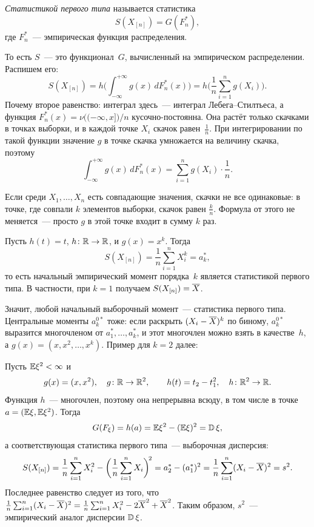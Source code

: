 \begin{definition}
  \emph{Статистикой первого типа} называется статистика
  \[
    S(X_{[n]}) = G(F_n^*),
  \]
  где $F_n^*$~--- эмпирическая функция распределения.
\end{definition}

То есть $S$~--- это функционал~$G$, вычисленный на эмпирическом распределении.
Распишем его:
\[
  S(X_{[n]})
  = h\biggl(\int_{-\infty}^{+\infty} g(x)\, dF_n^*(x)\biggr)
  = h\biggl(\frac{1}{n} \sum_{i=1}^{n} g(X_i)\biggr).
\]
Почему второе равенство: интеграл здесь~--- интеграл Лебега--Стилтьеса, а функция
$F_n^*(x) = \nu\bigl((-\infty, x]\bigr)/n$ кусочно-постоянна.
Она растёт только скачками в точках выборки, и в каждой точке $X_i$ скачок равен~$\frac1n$.
При интегрировании по такой функции значение $g$ в точке скачка умножается на величину
скачка, поэтому
\[
  \int_{-\infty}^{+\infty} g(x)\, dF_n^*(x) = \sum_{i=1}^{n} g(X_i) \cdot \frac{1}{n}.
\]

\begin{remark}
  Если среди $X_1, \ldots, X_n$ есть совпадающие значения, скачки не все одинаковые:
  в точке, где совпали $k$ элементов выборки, скачок равен $\frac{k}{n}$.
  Формула от этого не меняется~--- просто $g$ в этой точке входит в сумму $k$ раз.
\end{remark}

\begin{example}
  Пусть $h(t) = t$, $h \colon \mathbb{R} \to \mathbb{R}$, и $g(x) = x^k$. Тогда
  \[
    S(X_{[n]}) = \frac{1}{n} \sum_{i=1}^{n} X_i^k = a_k^*,
  \]
  то есть начальный эмпирический момент порядка~$k$ является статистикой первого типа.
  В частности, при $k = 1$ получаем $S(X_{[n]}) = \overline{X}$.
\end{example}

Значит, любой начальный выборочный момент~--- статистика первого типа.
Центральные моменты $a_k^{0*}$ тоже: если раскрыть $(X_i - \overline{X})^k$ по биному,
$a_k^{0*}$ выразится многочленом от $a_1^*, \ldots, a_k^*$, и этот многочлен можно взять
в качестве~$h$, а $g(x) = (x, x^2, \ldots, x^k)$. Пример для $k = 2$ далее:

\begin{example}
  Пусть $\mathbb{E}\xi^2 < \infty$ и
  \[
    g(x) = (x, x^2), \quad g \colon \mathbb{R} \to \mathbb{R}^2, \qquad
    h(t) = t_2 - t_1^2, \quad h \colon \mathbb{R}^2 \to \mathbb{R}.
  \]
  Функция $h$~--- многочлен, поэтому она непрерывна всюду, в том числе в точке
  $a = (\mathbb{E}\xi, \mathbb{E}\xi^2)$. Тогда
  \[
    G(F_\xi) = h(a) = \mathbb{E}\xi^2 - (\mathbb{E}\xi)^2 = \operatorname{\mathbb{D}}\xi,
  \]
  а соответствующая статистика первого типа~--- выборочная дисперсия:
  \[
    S(X_{[n]})
    = \frac{1}{n} \sum_{i=1}^{n} X_i^2 - \biggl(\frac{1}{n} \sum_{i=1}^{n} X_i\biggr)^{\!2}
    = a_2^* - (a_1^*)^2
    = \frac{1}{n} \sum_{i=1}^{n} (X_i - \overline{X})^2
    = s^2.
  \]
  Последнее равенство следует из того, что
  $\frac1n \sum_{i=1}^n (X_i - \overline{X})^2 = \frac1n \sum_{i=1}^n X_i^2 - 2\overline{X}^2 + \overline{X}^2$.
  Таким образом, $s^2$~--- эмпирический аналог дисперсии $\operatorname{\mathbb{D}}\xi$.
\end{example}

